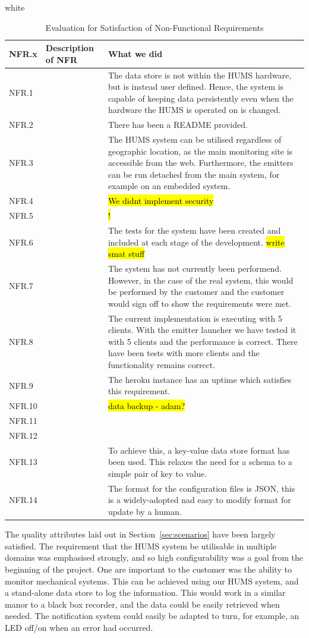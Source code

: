 \documentclass[10pt,a4paper]{article}
\newcommand{\tableformat}[4]{
\begin{table}[ht!]
\centering
  \rowcolors{2}{gray!10} {white}
\begin{tabular}{#1}
  \hline
  \rowcolor[gray]{0.9} #2
\end{tabular}
\caption{#3}
\label{#4}
\end{table}}
\begin{document}
\tableformat{| l | l | l |}{ \hline	NFR.x  & 	Description of NFR  & 	What we did \\ \hline
	NFR.1  & 	  & 	The data store is not within the HUMS hardware, but is instead user defined. Hence, the system is capable of keeping data persistently even when the hardware the HUMS is operated on is changed. \\ \hline
	NFR.2  & 	  & 	There has been a README provided. \\ \hline
	NFR.3  & 	  & 	The HUMS system can be utilised regardless of geographic location, as the main monitoring site is accessible from the web. Furthermore, the emitters can be run detached from the main system, for example on an embedded system. \\ \hline
	NFR.4  & 	  & 	\hl{We didnt implement security} \\ \hline
	NFR.5  & 	  & 	\hl{!} \\ \hline
	NFR.6  & 	  & 	The tests for the system have been created and included at each stage of the development. \hl{write smat stuff} \\ \hline
	NFR.7  & 	  & 	The system has not currently been performend. However, in the case of the real system, this would be performed by the customer and the customer would sign off to show the requirements were met. \\ \hline
	NFR.8  & 	  & 	The current implementation is executing with 5 clients. With the emitter launcher we have tested it with 5 clients and the performance is correct. There have been tests with more clients and the functionality remains correct. \\ \hline
	NFR.9  & 	  & 	The heroku instance has an uptime which satisfies this requirement. \\ \hline
	NFR.10  & 	  & 	\hl{data backup - adam?} \\ \hline
	NFR.11  & 	  & 	 \\ \hline
	NFR.12  & 	  & 	 \\ \hline
	NFR.13  & 	  & 	To achieve this, a key-value data store format has been used. This relaxes the need for a schema to a simple pair of key to value. \\ \hline
	NFR.14  & 	  & 	The format for the configuration files is JSON, this is a widely-adopted nad easy to modify format for update by a human. \\ \hline
}{Evaluation for Satisfaction of Non-Functional Requirements}{nfrevaltable}


The quality attributes laid out in Section~\ref{sec:scenarios} have been largely satisfied. The requirement that the HUMS system be utilisable in multiple domains was emphasised strongly, and so high configurability was a goal from the beginning of the project. One are important to the customer was the ability to monitor mechanical systems. This can be achieved using our HUMS system, and a stand-alone data store to log the information. This would work in a similar manor to a black box recorder, and the data could be easily retrieved when needed. The notification system could easily be adapted to turn, for example, an LED off/on when an error had occurred.
\end{document}
